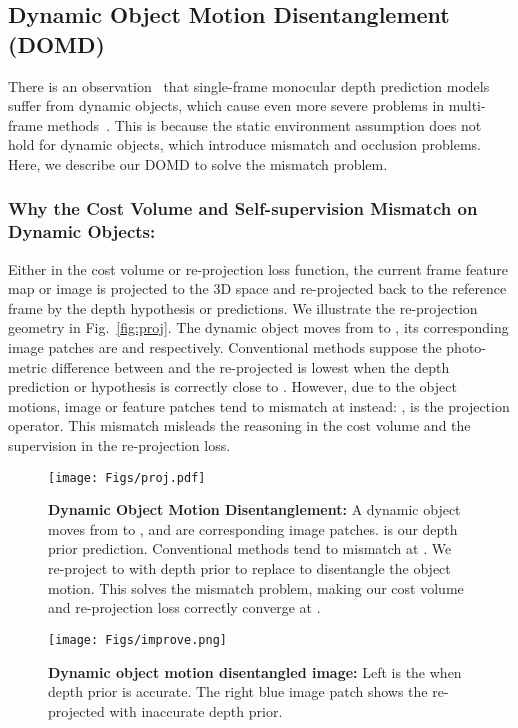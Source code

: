 \documentclass[runningheads]{llncs}
\begin{document}
\subsection{Dynamic Object Motion Disentanglement (DOMD)}
\label{sec:domd}
There is an observation~\cite{casser2018depth,monodepth2} that single-frame monocular depth prediction models suffer from dynamic objects, which cause even more severe problems in multi-frame methods~\cite{manydepth,monorec}. This is because the static environment assumption does not hold for dynamic objects, which introduce mismatch and occlusion problems. Here, we describe our DOMD to solve the mismatch problem.


\subsubsection{Why the Cost Volume and Self-supervision Mismatch on Dynamic Objects:}
Either in the cost volume or re-projection loss function, the current frame feature map  or image  is projected to the 3D space and re-projected back to the reference frame  by the depth hypothesis or predictions. We illustrate the re-projection geometry in Fig.~\ref{fig:proj}. The dynamic object moves from  to , its corresponding image patches are  and  respectively. Conventional methods suppose the photo-metric difference between  and the re-projected  is lowest when the depth prediction or hypothesis is correctly close to . However, due to the object motions, image or feature patches tend to mismatch at  instead: ,  is the projection operator. This mismatch misleads the reasoning in the cost volume and the supervision in the re-projection loss.




\begin{figure}[t]
\centering
\begin{minipage}{.7\textwidth}
  \centering
  \texttt{[image: Figs/proj.pdf]}
  \caption{\textbf{Dynamic Object Motion Disentanglement:} A dynamic object moves from  to ,  and  are corresponding image patches.  is our depth prior prediction. Conventional methods tend to mismatch at . We re-project  to  with depth prior  to replace  to disentangle the object motion. This solves the mismatch problem, making our cost volume and re-projection loss correctly converge at .}
  \label{fig:proj}
\end{minipage}\begin{minipage}{.3\textwidth}
  \centering
  \texttt{[image: Figs/improve.png]}
  \caption{\textbf{Dynamic object motion disentangled image:} Left is the  when depth prior is accurate. The right blue image patch shows the re-projected  with inaccurate depth prior.}
  \label{fig:improve}
\end{minipage}
\end{figure}
\end{document}
